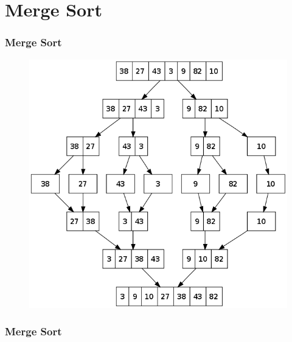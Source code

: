 \documentclass{beamer}
\begin{document}
\section{Merge Sort}
\begin{frame}
    \frametitle{Merge Sort}
    \begin{figure}[h]
        \includegraphics[scale=0.3]{merge/merge}
    \end{figure}
\end{frame}
\begin{frame}
    \frametitle{Merge Sort}
    \begin{multicols}{2}
        
        
    \end{multicols}
\end{frame}
\end{document}
